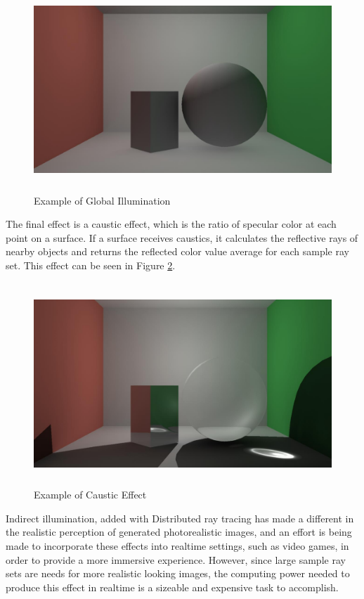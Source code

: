 \begin{figure}[h]
\centering
\includegraphics[height=3.0in]{figures/globalIll.jpg}
\caption{Example of Global Illumination}
\label{fig:globalill}
\end{figure}

The final effect is a caustic effect, which is the ratio of specular color at each point on a surface.  If a surface receives caustics, it calculates the reflective rays of nearby objects and returns the reflected color value average for each sample ray set.  This effect can be seen in Figure \ref{fig:caustics}.
\begin{figure}[h]
\centering
\includegraphics[height=3.0in]{figures/caustics.jpg}
\caption{Example of Caustic Effect}
\label{fig:caustics}
\end{figure}

Indirect illumination, added with Distributed ray tracing has made a different in the realistic perception of generated photorealistic images, and an effort is being made to incorporate these effects into realtime settings, such as video games, in order to provide a more immersive experience.  However, since large sample ray sets are needs for more realistic looking images, the computing power needed to produce this effect in realtime is a sizeable and expensive task to accomplish.  

